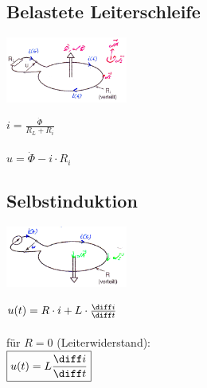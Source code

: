 \begin{minipage}[t]{8cm}
	\subsection{Belastete Leiterschleife}
		\begin{minipage}{4.5cm}
			\includegraphics[width = 4cm]
			{./images/induktion-belastete-leiterschleife}
		\end{minipage}
		\begin{minipage}{3cm}
			$i = \frac{\dot{\Phi}}{R_L + R_i}$\\
			\\
			$ u = \dot{\Phi} - i \cdot R_i$
		\end{minipage}
\end{minipage}
\begin{minipage}[t]{10cm}
	\subsection{Selbstinduktion}
		\begin{minipage}{4.5cm}
			\includegraphics[width = 4cm]
			{./images/induktion-selbstinduktion}
		\end{minipage}
		\begin{minipage}{5cm}
			$ u(t) = R\cdot i+ L \cdot \frac{\diff i}{\diff t}$\\ 
			\\
			für $R = 0$ {\small (Leiterwiderstand)}:\\
			$\boxed{ u(t) = L \frac{\diff i}{\diff t}}$
		\end{minipage}
\end{minipage}

\renewcommand{\arraystretch}{1.3}
